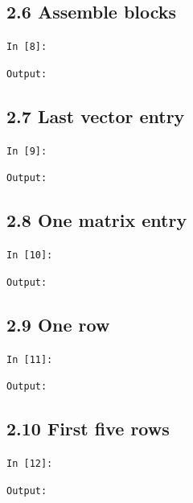 \documentclass[11pt]{article}
\begin{document}
\par\medskip\noindent\begin{minipage}{\linewidth}
\subsection*{2.6 Assemble blocks}
\noindent\texttt{In [8]:}

\noindent\texttt{Output:}

\end{minipage}\par

\par\medskip\noindent\begin{minipage}{\linewidth}
\subsection*{2.7 Last vector entry}
\noindent\texttt{In [9]:}

\noindent\texttt{Output:}

\end{minipage}\par

\par\medskip\noindent\begin{minipage}{\linewidth}
\subsection*{2.8 One matrix entry}
\noindent\texttt{In [10]:}

\noindent\texttt{Output:}

\end{minipage}\par

\par\medskip\noindent\begin{minipage}{\linewidth}
\subsection*{2.9 One row}
\noindent\texttt{In [11]:}

\noindent\texttt{Output:}

\end{minipage}\par

\par\medskip\noindent\begin{minipage}{\linewidth}
\subsection*{2.10 First five rows}
\noindent\texttt{In [12]:}

\noindent\texttt{Output:}

\end{minipage}\par
\end{document}
